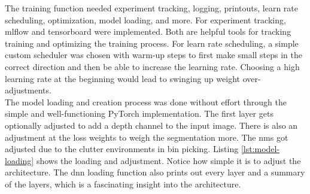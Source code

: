 		\clearpage
		The training function needed experiment tracking, logging, printouts, learn rate scheduling, optimization, model loading, and more. For experiment tracking, mlflow and tensorboard were implemented. Both are helpful tools for tracking training and optimizing the training process. For learn rate scheduling, a simple custom scheduler was chosen with warm-up steps to first make small steps in the correct direction and then be able to increase the learning rate. Choosing a high learning rate at the beginning would lead to swinging up weight over-adjustments. \\
		The model loading and creation process was done without effort through the simple and well-functioning PyTorch implementation. The first layer gets optionally adjusted to add a depth channel to the input image. There is also an adjustment at the loss weights to weigh the segmentation more. The \acl{nms} got adjusted due to the clutter environments in bin picking. Listing \ref{lst:model-loading} shows the loading and adjustment. Notice how simple it is to adjust the architecture. The \ac{dnn} loading function also prints out every layer and a summary of the layers, which is a fascinating insight into the architecture.
		
